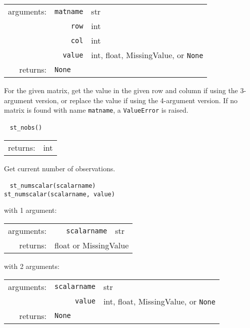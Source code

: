 \documentclass{article}
\begin{document}
			\indent \qquad \begin{tabular}{rrl}
					arguments: & \texttt{matname} & str \\
						& \texttt{row} & int \\
						& \texttt{col} & int \\
						& \texttt{value} & int, float, MissingValue, or \texttt{None} \\
					returns: & \multicolumn{2}{l}{\texttt{None}}
				\end{tabular}
				
			\vspace{1.5mm}
			\noindent For the given matrix, get the value in the given row and column if using the 3-argument version, or replace the value if using the 4-argument version. If no matrix is found with name \lstinline{matname}, a \lstinline{ValueError} is raised. \newline
			
			
			\ \newline
			\noindent \lstinline$st_nobs()$
								
			\vspace{1.5mm}
			\noindent 
			\indent \begin{tabular}{rl}
					returns: & int
				\end{tabular}
								
			\vspace{1.5mm}
			\noindent Get current number of observations. \newline
			
			
			\ \newline
			\noindent \lstinline$st_numscalar(scalarname)$ \\
			\noindent \lstinline$st_numscalar(scalarname, value)$
								
			\vspace{1.5mm}
			\noindent 
			\indent with 1 argument:
			
			\indent \qquad \begin{tabular}{rrl}
					arguments: & \texttt{scalarname} & str \\
					returns: & \multicolumn{2}{l}{float or MissingValue}
				\end{tabular}
								
			\vspace{1.5mm}
			\noindent 
			\indent with 2 arguments:
			
			\indent \qquad \begin{tabular}{rrl}
					arguments: & \texttt{scalarname} & str \\
					  & \texttt{value} & int, float, MissingValue, or \texttt{None} \\
					returns: & \multicolumn{2}{l}{\texttt{None}}
				\end{tabular}
								
\end{document}
